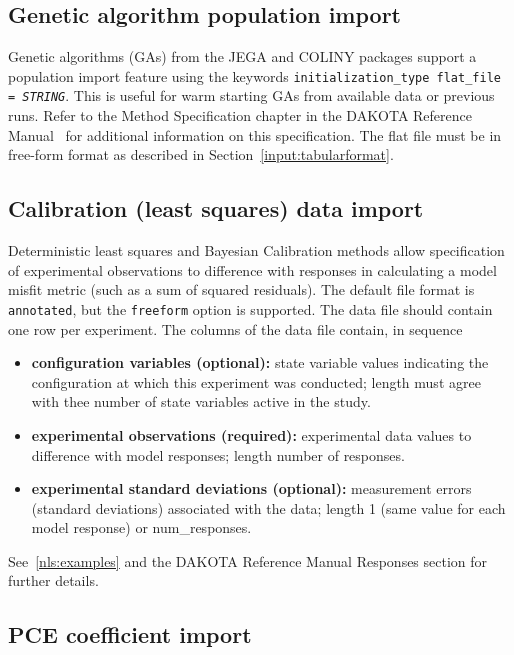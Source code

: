 \subsection{Genetic algorithm population import}

Genetic algorithms (GAs) from the JEGA and COLINY packages support a
population import feature using the keywords
\texttt{initialization\_type flat\_file = \emph{STRING}}.  This is
useful for warm starting GAs from available data or previous runs.
Refer to the Method Specification chapter in the DAKOTA Reference
Manual~\cite{RefMan} for additional information on this specification.
The flat file must be in free-form format as described in
Section~\ref{input:tabularformat}.

\subsection{Calibration (least squares) data import}

Deterministic least squares and Bayesian Calibration methods allow
specification of experimental observations to difference with
responses in calculating a model misfit metric (such as a sum of
squared residuals).  The default file format is {\tt annotated}, but
the {\tt freeform} option is supported.  The data file should contain
one row per experiment.   The columns of the data file contain, in sequence
\begin{itemize}
\item {\bf configuration variables (optional):} state variable values
  indicating the configuration at which this experiment was conducted;
  length must agree with thee number of state variables active in the
  study.
\item {\bf experimental observations (required):} experimental data
  values to difference with model responses; length number of
  responses.
\item {\bf experimental standard deviations (optional):} measurement
  errors (standard deviations) associated with the data; length 1
  (same value for each model response) or num\_responses.
\end{itemize}
See~\ref{nls:examples} and the DAKOTA Reference Manual Responses
section for further details.

\subsection{PCE coefficient import}

